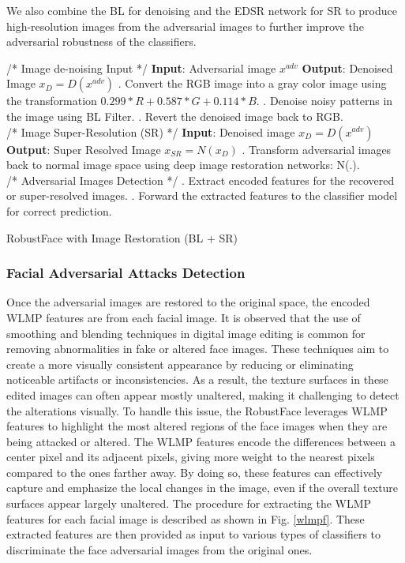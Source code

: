 \documentclass[sn-mathphys]{sn-jnl}%
\theoremstyle{thmstyleone}%
\theoremstyle{thmstyletwo}%
\theoremstyle{thmstylethree}%
\begin{document}
We also combine the BL for denoising and the EDSR network for SR to produce high-resolution images from the adversarial images to further improve the adversarial robustness of the classifiers.
 
\begin{algorithm} 
  \begin{algorithmic}
    \State /* Image de-noising Input */ 
    \State \textbf{Input}: Adversarial image $x^{adv}$ 
    \State \textbf{Output}: Denoised Image $x_D = D(x^{adv})$
    . Convert the RGB image into a gray color image using the transformation $0.299*R + 0.587*G + 0.114*B$.
    . Denoise noisy patterns in the image using BL Filter.
    . Revert the denoised image back to RGB.\\
    
    \State /* Image Super-Resolution (SR) */
    \State \textbf{Input}: Denoised image $x_D = D(x^{adv})$ 
    \State \textbf{Output}: Super Resolved Image $x_{SR} = N(x_D)$
    . Transform adversarial images back to normal image space using deep image restoration networks: N(.).\\
    \State /* Adversarial Images Detection  */
    . Extract encoded features for the recovered or super-resolved images.
    . Forward the extracted features to the classifier model for correct prediction.
    
  \end{algorithmic} 
  \caption{RobustFace with Image Restoration (BL + SR)}
  \label{alg:algorithm1}
\end{algorithm}

\subsubsection{Facial Adversarial Attacks Detection}
Once the adversarial images are restored to the original space, the encoded WLMP features \cite{agarwal2017swapped} are from each facial image.  It is observed that the use of smoothing and blending techniques in digital image editing is common for removing abnormalities in fake or altered face images. These techniques aim to create a more visually consistent appearance by reducing or eliminating noticeable artifacts or inconsistencies. As a result, the texture surfaces in these edited images can often appear mostly unaltered, making it challenging to detect the alterations visually. To handle this issue, the RobustFace leverages WLMP features to highlight the most altered regions of the face images when they are being attacked or altered. The WLMP features encode the differences between a center pixel and its adjacent pixels, giving more weight to the nearest pixels compared to the ones farther away. By doing so, these features can effectively capture and emphasize the local changes in the image, even if the overall texture surfaces appear largely unaltered. The procedure for extracting the WLMP features for each facial image is described as shown in Fig. \ref{wlmpf}. These extracted features are then provided as input to various types of classifiers to discriminate the face adversarial images from the original ones. 
\end{document}
